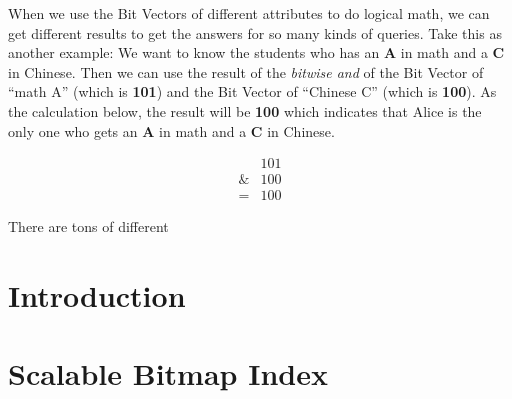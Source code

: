 \documentclass[12pt, a4paper]{article}
\begin{document}
When we use the Bit Vectors of different attributes to do logical math, we can get different results to get the answers for so many kinds of queries. Take this as another example: We want to know the students who has an \textbf{A} in math and a \textbf{C} in Chinese. Then we can use the result of the \emph{bitwise and} of the Bit Vector of ``math A'' (which is \textbf{101}) and the Bit Vector of ``Chinese C'' (which is \textbf{100}). As the calculation below, the result will be \textbf{100} which indicates that Alice is the only one who gets an \textbf{A} in math and a \textbf{C} in Chinese.

\begin{align}
  &101\\
  \& &100\\
  = &100
\end{align}

There are tons of different

\section{Introduction}

\section{Scalable Bitmap Index}

\citep{name}



\end{document}
